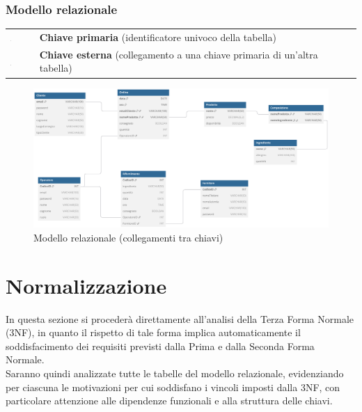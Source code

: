 \documentclass[12pt,a4paper]{article}
\begin{document}
    \newpage
    \subsubsection{Modello relazionale}
    \begin{tcolorbox}[
        colback=gray!8,  
        colframe=darkgray, 
        title=Legenda del modello relazionale
    ]
        \begin{tabular}{@{} >{\centering\arraybackslash}m{0.5cm} p{14cm} @{}}
            \includegraphics[width=0.025\textwidth]{figures/g132.pdf} & \textbf{Chiave primaria} (identificatore univoco della tabella) \\
            \addlinespace[0.5em]
            \includegraphics[width=0.025\textwidth]{figures/path621.pdf} & \textbf{Chiave esterna} (collegamento a una chiave primaria di un'altra tabella) \\ 
        \end{tabular}
    \end{tcolorbox}  
     
    \begin{figure}[H]
        \centering 
        \vspace{-10pt}  %
        \includegraphics[width=\textwidth]{figures/Relational_model.pdf}
        \vspace{-20pt}  %
        \caption{Modello relazionale (collegamenti tra chiavi)}
    \end{figure} 

    \newpage
    \section{Normalizzazione}
    In questa sezione si procederà direttamente all'analisi della Terza Forma Normale (3NF), in quanto il rispetto di tale forma implica automaticamente il soddisfacimento dei requisiti previsti dalla Prima e dalla Seconda Forma Normale. \\
    Saranno quindi analizzate tutte le tabelle del modello relazionale, evidenziando per ciascuna le motivazioni per cui soddisfano i vincoli imposti dalla 3NF, con particolare attenzione alle dipendenze funzionali e alla struttura delle chiavi.
\end{document}
